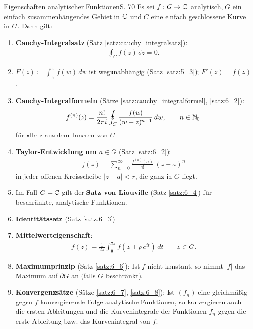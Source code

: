 \begin{bemerkung}{Eigenschaften analytischer Funktionen}{S. 70}
  Es sei $f: G \to \mathbb{C}$ analytisch, $G$ ein einfach zusammenhängendes Gebiet in $\mathbb{C}$ und $C$ eine einfach geschlossene Kurve in $G$.
  Dann gilt:
  \begin{enumerate}
    \item \textbf{Cauchy-Integralsatz} (Satz \ref{satz:cauchy_integralsatz}):
      \begin{align}
        \oint_C f(z) \, dz = 0 .
      \end{align}
    \item $\displaystyle F(z) \coloneqq \int_{z_0}^z f(w) \, dw$ ist wegunabhängig (Satz \ref{satz:5_3}); $F'(z) = f(z)$.
    \item \textbf{Cauchy-Integralformeln} (Sätze \ref{satz:cauchy_integralformel}, \ref{satz:6_2}):
      \begin{align}
        f^{(n)}(z) =  \frac{n!}{2 \pi i} \oint_{C} \frac{f(w)}{(w-z)^{n+1}} \, dw, \qquad n \in \mathbb{N}_0
      \end{align}
      für alle $z$ aus dem Inneren von $C$.
    \item \textbf{Taylor-Entwicklung um $a \in G$} (Satz \ref{satz:6_2}):
      \begin{align}
        f(z) = \sum_{n=0}^\infty \frac{f^{(n)}(a)}{n!} \, (z - a)^n %
      \end{align}
      in jeder offenen Kreisscheibe $|z-a| < r$, die ganz in $G$ liegt.
    \item Im Fall $G = \mathbb{C}$ gilt der \textbf{Satz von Liouville} (Satz \ref{satz:6_4}) für beschränkte, analytische Funktionen.
    \item \textbf{Identitätssatz} (Satz \ref{satz:6_3})
    \item \textbf{Mittelwerteigenschaft}:
      \begin{align}
        f(z) = \frac{1}{2 \pi} \int_0^{2 \pi} f \left( z + \rho \, e^{it} \right) \, dt \qquad z \in G .
      \end{align}
    \item \textbf{Maximumprinzip} (Satz \ref{satz:6_6}): Ist $f$ nicht konstant, so nimmt $|f|$ das Maximum auf $\partial G$ an (falls $G$ beschränkt).
    \item \textbf{Konvergenzsätze} (Sätze \ref{satz:6_7}, \ref{satz:6_8}): Ist $(f_n)$ eine gleichmäßig gegen $f$ konvergierende Folge analytische Funktionen, so konvergieren auch die ersten Ableitungen und die Kurvenintegrale der Funktionen $f_n$ gegen die erste Ableitung bzw. das Kurvenintegral von $f$.
  \end{enumerate}
\end{bemerkung}
